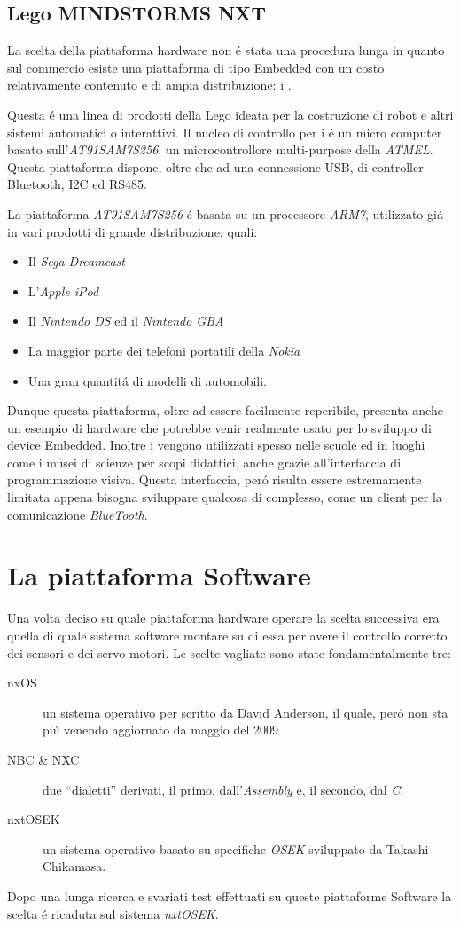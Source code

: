 \subsection{Lego MINDSTORMS NXT}
La scelta della piattaforma hardware non \'e stata una procedura lunga in
quanto sul commercio esiste una piattaforma di tipo Embedded con un costo
relativamente contenuto e di ampia distribuzione: i \nxt.

Questa \'e una linea di prodotti della Lego
ideata per la costruzione di robot e altri sistemi automatici o
interattivi.  Il nucleo di controllo per i
\nxt{} \'e un micro computer basato sull'\emph{AT91SAM7S256}, un
microcontrollore multi-purpose della \emph{ATMEL}. Questa piattaforma
dispone, oltre che ad una connessione USB, di controller Bluetooth, I2C ed
RS485.

La piattaforma \emph{AT91SAM7S256} \'e basata su un processore
\emph{ARM7}, utilizzato gi\'a in vari prodotti di grande distribuzione,
quali:
\begin{itemize}
    \item Il \emph{Sega Dreamcast}
    \item L'\emph{Apple iPod}
    \item Il \emph{Nintendo DS} ed il \emph{Nintendo GBA}
    \item La maggior parte dei telefoni portatili della \emph{Nokia}
    \item Una gran quantit\'a di modelli di automobili.
\end{itemize}
Dunque questa piattaforma, oltre ad essere facilmente reperibile, presenta
anche un esempio di hardware che potrebbe venir realmente usato per lo
sviluppo di device Embedded. Inoltre i \nxt{} vengono utilizzati spesso
nelle scuole ed in luoghi come i musei di scienze per scopi didattici,
anche grazie all'interfaccia di programmazione visiva. Questa interfaccia,
per\'o risulta essere estremamente limitata appena bisogna sviluppare
qualcosa di complesso, come un client per la comunicazione
\emph{BlueTooth}.

\section{La piattaforma Software}
Una volta deciso su quale piattaforma hardware operare la scelta successiva
era quella di quale sistema software montare su di essa per avere il
controllo corretto dei sensori e dei servo motori. Le scelte vagliate sono
state fondamentalmente tre:
\begin{description}
    \item[nxOS]un sistema operativo per \nxt{} scritto da David Anderson,
    il quale, per\'o non sta pi\'u venendo aggiornato da maggio del 2009
    \item[NBC \& NXC]due ``dialetti'' derivati, il primo,
    dall'\emph{Assembly} e, il secondo, dal \emph{C}.
    \item[nxtOSEK]un sistema operativo basato su specifiche \emph{OSEK}
    sviluppato da Takashi Chikamasa.
\end{description}
Dopo una lunga ricerca e svariati test effettuati su queste piattaforme
Software la scelta \'e ricaduta sul sistema \emph{nxtOSEK}.

